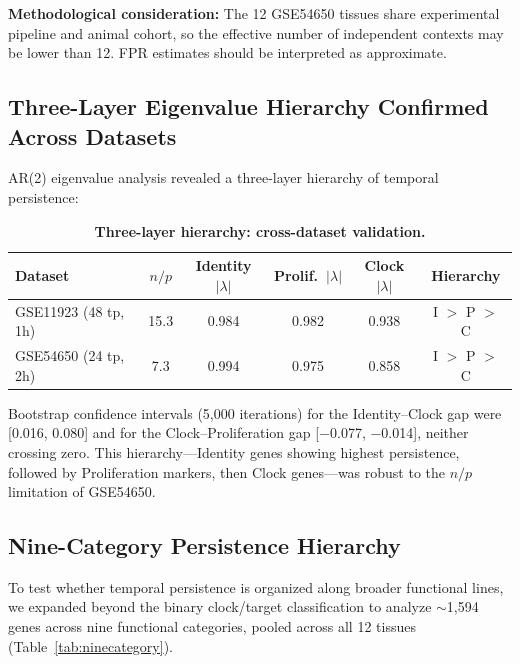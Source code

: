 \documentclass[11pt,letterpaper]{article}
\begin{document}
\textbf{Methodological consideration:} The 12 GSE54650 tissues share experimental pipeline and animal cohort, so the effective number of independent contexts may be lower than 12. FPR estimates should be interpreted as approximate.

\subsection{Three-Layer Eigenvalue Hierarchy Confirmed Across Datasets}

AR(2) eigenvalue analysis revealed a three-layer hierarchy of temporal persistence:

\begin{table}[H]
\centering
\caption{\textbf{Three-layer hierarchy: cross-dataset validation.}}
\label{tab:hierarchy}
\begin{tabular}{lccccc}
\toprule
Dataset & $n/p$ & Identity $|\lambda|$ & Prolif.\ $|\lambda|$ & Clock $|\lambda|$ & Hierarchy \\
\midrule
GSE11923 (48 tp, 1h) & 15.3 & 0.984 & 0.982 & 0.938 & I $>$ P $>$ C \\
GSE54650 (24 tp, 2h) & 7.3 & 0.994 & 0.975 & 0.858 & I $>$ P $>$ C \\
\bottomrule
\end{tabular}
\end{table}

Bootstrap confidence intervals (5,000 iterations) for the Identity--Clock gap were [0.016, 0.080] and for the Clock--Proliferation gap [$-$0.077, $-$0.014], neither crossing zero. This hierarchy---Identity genes showing highest persistence, followed by Proliferation markers, then Clock genes---was robust to the $n/p$ limitation of GSE54650.

\subsection{Nine-Category Persistence Hierarchy}

To test whether temporal persistence is organized along broader functional lines, we expanded beyond the binary clock/target classification to analyze $\sim$1,594 genes across nine functional categories, pooled across all 12 tissues (Table~\ref{tab:ninecategory}).
\end{document}
